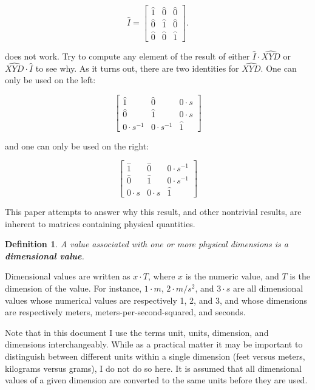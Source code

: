 \documentclass[10pt,letterpaper]{article}
\newtheorem{defn}{Definition}[section]
\numberwithin{equation}{section}
\begin{document}
\[ \hat I = \left[ \begin{matrix} 
  \hat 1 & \hat 0 & \hat 0 \\
  \hat 0 & \hat 1 & \hat 0 \\
  \hat 0 & \hat 0 & \hat 1
 \end{matrix} \right]. \]
 
does not work.  Try to compute any element of the result of either
$\hat I \cdot \widehat{XYD}$ or $\widehat{XYD} \cdot \hat I$ to see
why.  As it turns out, there are two identities for $\widehat{XYD}$.
One can only be used on the left:
 
 \[ \left[ \begin{matrix} 
  \hat 1 & \hat 0 & 0 \cdot s \\
  \hat 0 & \hat 1 & 0 \cdot s \\
  0 \cdot s^{-1} & 0 \cdot s^{-1} & \hat 1
 \end{matrix} \right] \]

and one can only be used on the right:

\[ \left[ \begin{matrix} 
  \hat 1 & \hat 0 & 0 \cdot s^{-1} \\
  \hat 0 & \hat 1 & 0 \cdot s^{-1} \\
  0 \cdot s & 0 \cdot s & \hat 1
 \end{matrix} \right] \]
 
This paper attempts to answer why this result, and other nontrivial
results, are inherent to matrices containing physical quantities.

\begin{defn} A value associated with one or more physical dimensions
  is a \textbf{dimensional value}. \end{defn}

Dimensional values are written as $x \cdot T$, where $x$ is the
numeric value, and $T$ is the dimension of the value.  For instance,
$1 \cdot m$, $2 \cdot m/s^2$, and $3 \cdot s$ are all dimensional
values whose numerical values are respectively 1, 2, and 3, and whose
dimensions are respectively meters, meters-per-second-squared, and
seconds.
 
Note that in this document I use the terms unit, units, dimension, and
dimensions interchangeably.  While as a practical matter it may be
important to distinguish between different units within a single
dimension (feet versus meters, kilograms versus grams), I do not do so
here.  It is assumed that all dimensional values of a given dimension
are converted to the same units before they are used.
 
\end{document}
